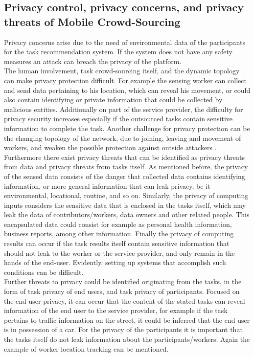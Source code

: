 \documentclass[a4paper,12pt]{report}
\begin{document}
		\subsection{Privacy control, privacy concerns, and privacy threats of Mobile Crowd-Sourcing}
		\startsubsection
			Privacy concerns arise due to the need of environmental data of the participants for the task recommendation system. If the system does not have any safety measures an attack can breach the privacy of the platform. \\
			The human involvement, task crowd-sourcing itself, and the dynamic topology can make privacy protection difficult.
			For example the sensing worker can collect and send data pertaining to his location, which can reveal his movement, or could also contain identifying or private information that could be collected by malicious entities. Additionally on part of the service provider, the difficulty for privacy security increases especially if the outsourced tasks contain sensitive information to complete the task. Another challenge for privacy protection can be the changing topology of the network, due to joining, leaving and movement of workers, and weaken the possible protection against outside attackers \cite{SecPriMobCSM}.\\
			Furthermore there exist privacy threats that can be identified as privacy threats from data and privacy threats from tasks itself. As mentioned before, the privacy of the sensed data consists of the danger that collected data contains identifying information, or more general information that can leak privacy, be it environmental, locational, routine, and so on. Similarly, the privacy of computing inputs considers the sensitive data that is enclosed in the tasks itself, which may leak the data of contributors/workers, data owners and other related people. This encapsulated data could consist for example as personal health information, business reports, among other information. Finally the privacy of computing results can occur if the task results itself contain sensitive information that should not leak to the worker or the service provider, and only remain in the hands of the end-user. Evidently, setting up systems that accomplish such conditions can be difficult.\\
			Further threats to privacy could be identified originating from the tasks, in the form of task privacy of end users, and task privacy of participants. Focused on the end user privacy, it can occur that the content of the stated tasks can reveal information of the end user to the service provider, for example if the task pertains to traffic information on the street, it could be inferred that the end user is in possession of a car. For the privacy of the participants it is important that the tasks itself do not leak information about the participants/workers. Again the example of worker location tracking can be mentioned.\\
\end{document}
